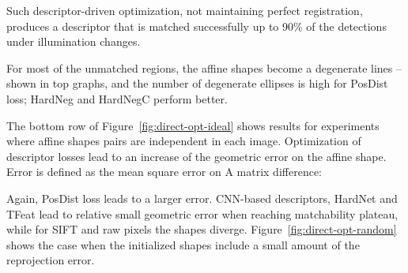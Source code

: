 \documentclass[runningheads]{llncs}
\begin{document}
Such descriptor-driven optimization, not maintaining perfect registration, produces a descriptor that is matched successfully up to 90\% of the detections under illumination changes. 

For most of the unmatched regions, the affine shapes become a degenerate lines -- shown in top graphs, and the number of degenerate ellipses is high for PosDist loss; HardNeg and HardNegC perform better.

The bottom row of Figure~\ref{fig:direct-opt-ideal} shows results for experiments where affine shapes pairs are independent in each image. Optimization of  descriptor losses lead to an increase of the geometric error on the affine shape. Error  is defined as the mean square error on A matrix difference:

Again, PosDist loss leads to a larger error. CNN-based descriptors, HardNet and TFeat lead to relative small geometric error when reaching matchability plateau, while for SIFT and raw pixels the shapes diverge. Figure~\ref{fig:direct-opt-random} shows the case when the initialized shapes include a small amount of the reprojection error. 
\end{document}
